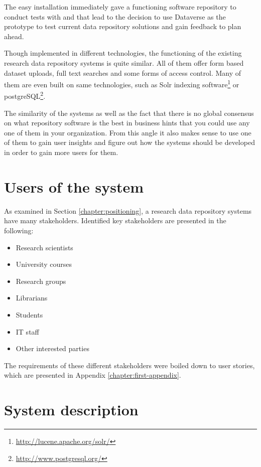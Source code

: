 The easy installation immediately gave a functioning software repository to
conduct tests with and that lead to the decision to use Dataverse as the
prototype to test current data repository solutions and gain feedback to plan
ahead.

Though implemented in different technologies, the functioning of the existing
research data repository systems is quite similar. All of them offer form based
dataset uploads, full text searches and some forms of access control. Many of
them are even built on same technologies, such as Solr indexing
software\footnote{\label{solr}\url{http://lucene.apache.org/solr/}} or
postgreSQL\footnote{\label{postgre}\url{http://www.postgresql.org/}}.

The similarity of the systems as well as the fact that there is no global
consensus on what repository software is the best in business hints that you
could use any one of them in your organization. From this angle it also makes
sense to use one of them to gain user insights and figure out how the systems
should be developed in order to gain more users for them.

\section{Users of the system}
\label{sec:users}

As examined in Section \ref{chapter:positioning}, a research data repository
systems have many stakeholders. Identified key stakeholders are presented in
the following:

\begin{itemize}
    \item Research scientists
    \item University courses
    \item Research groups
    \item Librarians
    \item Students
    \item IT staff
    \item Other interested parties
\end{itemize}

The requirements of these different stakeholders were boiled down to user
stories, which are presented in Appendix \ref{chapter:first-appendix}.

\section{System description}
\label{sec:system_description}

